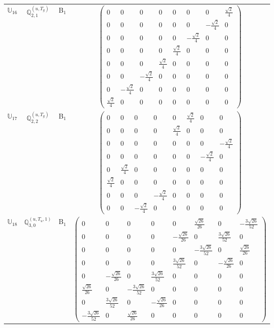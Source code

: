 \documentclass[fleqn,10pt,landscape]{article}
\begin{document}
\begin{itemize}
\begin{center}
\begin{longtable}{c|c|c|c}
$ \mathbb{U}_{16} $ & $\mathbb{Q}_{2,1}^{(u,T_{g})}$ & B$_{1}$ & $\begin{pmatrix} 0 & 0 & 0 & 0 & 0 & 0 & 0 & \frac{\sqrt{2}}{4} \\ 0 & 0 & 0 & 0 & 0 & 0 & - \frac{\sqrt{2}}{4} & 0 \\ 0 & 0 & 0 & 0 & 0 & - \frac{\sqrt{2}}{4} & 0 & 0 \\ 0 & 0 & 0 & 0 & \frac{\sqrt{2}}{4} & 0 & 0 & 0 \\ 0 & 0 & 0 & \frac{\sqrt{2}}{4} & 0 & 0 & 0 & 0 \\ 0 & 0 & - \frac{\sqrt{2}}{4} & 0 & 0 & 0 & 0 & 0 \\ 0 & - \frac{\sqrt{2}}{4} & 0 & 0 & 0 & 0 & 0 & 0 \\ \frac{\sqrt{2}}{4} & 0 & 0 & 0 & 0 & 0 & 0 & 0 \end{pmatrix}$ \\
$ \mathbb{U}_{17} $ & $\mathbb{Q}_{2,2}^{(u,T_{g})}$ & B$_{1}$ & $\begin{pmatrix} 0 & 0 & 0 & 0 & 0 & \frac{\sqrt{2}}{4} & 0 & 0 \\ 0 & 0 & 0 & 0 & \frac{\sqrt{2}}{4} & 0 & 0 & 0 \\ 0 & 0 & 0 & 0 & 0 & 0 & 0 & - \frac{\sqrt{2}}{4} \\ 0 & 0 & 0 & 0 & 0 & 0 & - \frac{\sqrt{2}}{4} & 0 \\ 0 & \frac{\sqrt{2}}{4} & 0 & 0 & 0 & 0 & 0 & 0 \\ \frac{\sqrt{2}}{4} & 0 & 0 & 0 & 0 & 0 & 0 & 0 \\ 0 & 0 & 0 & - \frac{\sqrt{2}}{4} & 0 & 0 & 0 & 0 \\ 0 & 0 & - \frac{\sqrt{2}}{4} & 0 & 0 & 0 & 0 & 0 \end{pmatrix}$ \\
$ \mathbb{U}_{18} $ & $\mathbb{Q}_{3,0}^{(u,T_{u},1)}$ & B$_{1}$ & $\begin{pmatrix} 0 & 0 & 0 & 0 & 0 & \frac{\sqrt{26}}{26} & 0 & - \frac{3 \sqrt{26}}{52} \\ 0 & 0 & 0 & 0 & - \frac{\sqrt{26}}{26} & 0 & \frac{3 \sqrt{26}}{52} & 0 \\ 0 & 0 & 0 & 0 & 0 & - \frac{3 \sqrt{26}}{52} & 0 & \frac{\sqrt{26}}{26} \\ 0 & 0 & 0 & 0 & \frac{3 \sqrt{26}}{52} & 0 & - \frac{\sqrt{26}}{26} & 0 \\ 0 & - \frac{\sqrt{26}}{26} & 0 & \frac{3 \sqrt{26}}{52} & 0 & 0 & 0 & 0 \\ \frac{\sqrt{26}}{26} & 0 & - \frac{3 \sqrt{26}}{52} & 0 & 0 & 0 & 0 & 0 \\ 0 & \frac{3 \sqrt{26}}{52} & 0 & - \frac{\sqrt{26}}{26} & 0 & 0 & 0 & 0 \\ - \frac{3 \sqrt{26}}{52} & 0 & \frac{\sqrt{26}}{26} & 0 & 0 & 0 & 0 & 0 \end{pmatrix}$ \\

\end{longtable}
\end{center}
\end{itemize}
\end{document}
